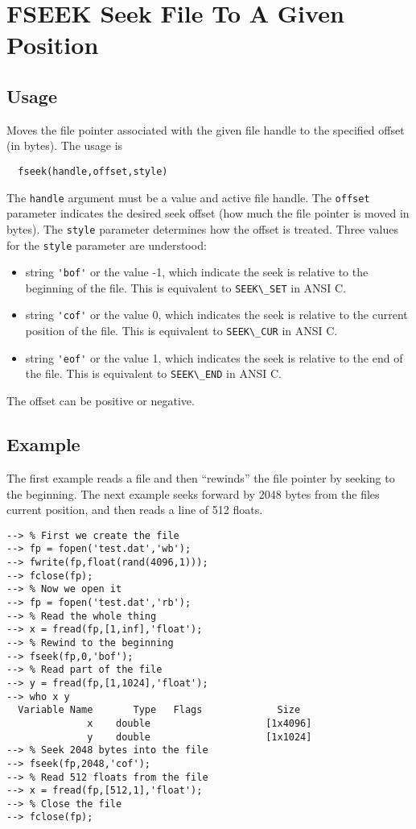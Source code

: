 \section{FSEEK Seek File To A Given Position}

\subsection{Usage}

Moves the file pointer associated with the given file handle to 
the specified offset (in bytes).  The usage is
\begin{verbatim}
  fseek(handle,offset,style)
\end{verbatim}
The \verb|handle| argument must be a value and active file handle.  The
\verb|offset| parameter indicates the desired seek offset (how much the
file pointer is moved in bytes).  The \verb|style| parameter determines
how the offset is treated.  Three values for the \verb|style| parameter
are understood:
\begin{itemize}
\item  string \verb|'bof'| or the value -1, which indicate the seek is relative
to the beginning of the file.  This is equivalent to \verb|SEEK\_SET| in
ANSI C.

\item  string \verb|'cof'| or the value 0, which indicates the seek is relative
to the current position of the file.  This is equivalent to 
\verb|SEEK\_CUR| in ANSI C.

\item  string \verb|'eof'| or the value 1, which indicates the seek is relative
to the end of the file.  This is equivalent to \verb|SEEK\_END| in ANSI
C.

\end{itemize}
The offset can be positive or negative.
\subsection{Example}

The first example reads a file and then ``rewinds'' the file pointer by seeking to the beginning.
The next example seeks forward by 2048 bytes from the files current position, and then reads a line of 512 floats.
\begin{verbatim}
--> % First we create the file
--> fp = fopen('test.dat','wb');
--> fwrite(fp,float(rand(4096,1)));
--> fclose(fp);
--> % Now we open it
--> fp = fopen('test.dat','rb');
--> % Read the whole thing
--> x = fread(fp,[1,inf],'float');
--> % Rewind to the beginning
--> fseek(fp,0,'bof');
--> % Read part of the file
--> y = fread(fp,[1,1024],'float');
--> who x y
  Variable Name       Type   Flags             Size
              x    double                    [1x4096]
              y    double                    [1x1024]
--> % Seek 2048 bytes into the file
--> fseek(fp,2048,'cof');
--> % Read 512 floats from the file
--> x = fread(fp,[512,1],'float');
--> % Close the file
--> fclose(fp);
\end{verbatim}
